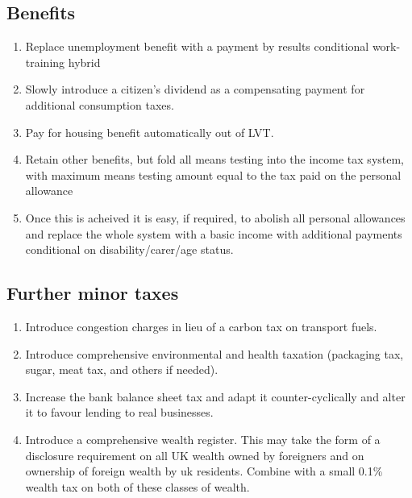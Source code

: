 \documentclass[]{tufte-handout}
\providecommand{\tightlist}{%
  \setlength{\itemsep}{0pt}\setlength{\parskip}{0pt}}
\begin{document}
\hypertarget{benefits}{%
\subsection{Benefits}\label{benefits}}

\begin{enumerate}
\def\labelenumi{\arabic{enumi}.}
\tightlist
\item
  Replace unemployment benefit with a payment by results conditional
  work-training hybrid
\item
  Slowly introduce a citizen's dividend as a compensating payment for
  additional consumption taxes.
\item
  Pay for housing benefit automatically out of LVT.
\item
  Retain other benefits, but fold all means testing into the income tax
  system, with maximum means testing amount equal to the tax paid on the
  personal allowance
\item
  Once this is acheived it is easy, if required, to abolish all personal
  allowances and replace the whole system with a basic income with
  additional payments conditional on disability/carer/age status.
\end{enumerate}

\hypertarget{further-minor-taxes}{%
\subsection{Further minor taxes}\label{further-minor-taxes}}

\begin{enumerate}
\def\labelenumi{\arabic{enumi}.}
\tightlist
\item
  Introduce congestion charges in lieu of a carbon tax on transport
  fuels.
\item
  Introduce comprehensive environmental and health taxation (packaging
  tax, sugar, meat tax, and others if needed).
\item
  Increase the bank balance sheet tax and adapt it counter-cyclically
  and alter it to favour lending to real businesses.
\item
  Introduce a comprehensive wealth register. This may take the form of a
  disclosure requirement on all UK wealth owned by foreigners and on
  ownership of foreign wealth by uk residents. Combine with a small
  0.1\% wealth tax on both of these classes of wealth.
\end{enumerate}

\newpage
\end{document}
